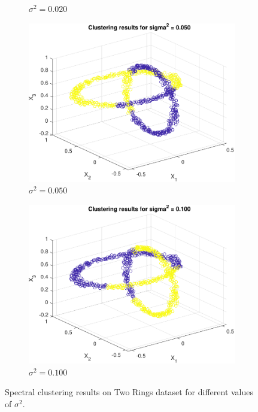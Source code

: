 \documentclass{article}
\begin{document}
\begin{figure}[h]
\begin{subfigure}[b]{0.3\textwidth}
                 \caption{$\sigma^2 = 0.020$}
                 \label{fig:spectral_4}
             \end{subfigure}
            \hfill
             \begin{subfigure}[b]{0.3\textwidth}
                 \includegraphics[width=\textwidth]{Assignment 3/figures/1_2/spectral_rings_sig2_0.050.pdf}
                 \caption{$\sigma^2 = 0.050$}
                 \label{fig:spectral_5}
             \end{subfigure}
                         \hfill
             \begin{subfigure}[b]{0.3\textwidth}
                 \includegraphics[width=\textwidth]{Assignment 3/figures/1_2/spectral_rings_sig2_0.100.pdf}
                 \caption{$\sigma^2 = 0.100$}
                 \label{fig:spectral_6}
             \end{subfigure}
            \caption{Spectral clustering results on Two Rings dataset for different values of $\sigma^2$.}
        \end{figure}
    
\end{document}

